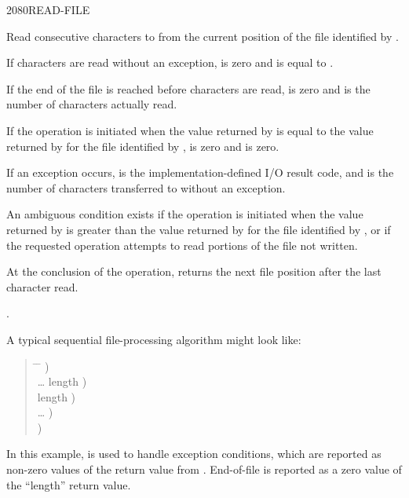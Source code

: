\vspace*{-7ex}
\begin{worddef}{2080}{READ-FILE}
\item {}

	Read  consecutive characters to  from the
	current position of the file identified by .

	If  characters are read without an exception, 
	is zero and  is equal to .

	If the end of the file is reached before  characters are
	read,  is zero and  is the number of characters
	actually read.

	If the operation is initiated when the value returned by
	 is equal to the value returned by
	 for the file identified by ,
	 is zero and  is zero.

	If an exception occurs,  is the implementation-defined
	I/O result code, and  is the number of characters
	transferred to  without an exception.

	An ambiguous condition exists if the operation is initiated when
	the value returned by  is greater than the
	value returned by  for the file identified by
	, or if the requested operation attempts to read
	portions of the file not written.

	At the conclusion of the operation,  returns
	the next file position after the last character read.

\see {}.

	\begin{rationale} %
		A typical sequential file-processing algorithm might look like:
		\begin{quote}\ttfamily{}
			\begin{tabbing}
			\tab \= \hspace{12em} \= \kill
								\>\>  ) \\
			\> {\ldots}  
											\>	  length ) \\
			 		\>\> \word{p} length ) \\
			\> {\ldots}						\>	  ) \\
								\>\>  )
			\end{tabbing}
		\end{quote}

		In this example,  is used to handle
		exception conditions, which are reported as
		non-zero values of the  return value from
		. End-of-file is reported as a zero value of
		the ``length'' return value.
	\end{rationale}
\end{worddef}

